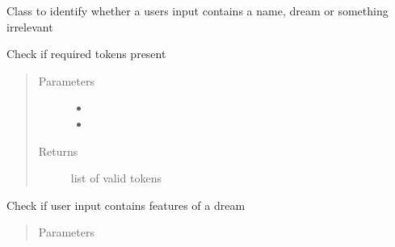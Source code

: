 \documentclass[letterpaper,10pt,english]{sphinxmanual}
\begin{document}
\begin{fulllineitems}
\label{\detokenize{index:Fralysis.MessageTypeAnalysis.MessageTypeAnalysis}}
Class to identify whether a users input contains a name, dream or something irrelevant

\begin{fulllineitems}
\label{\detokenize{index:Fralysis.MessageTypeAnalysis.MessageTypeAnalysis.check_token}}
Check if required tokens present
\begin{quote}\begin{description}
\item[{Parameters}] \leavevmode\begin{itemize}
\item {} 
 \textendash{} 

\item {} 
 \textendash{} 

\end{itemize}

\item[{Returns}] \leavevmode
list of valid tokens

\end{description}\end{quote}

\end{fulllineitems}


\begin{fulllineitems}
\label{\detokenize{index:Fralysis.MessageTypeAnalysis.MessageTypeAnalysis.is_dream}}
Check if user input contains features of a dream
\begin{quote}\begin{description}
\item[{Parameters}] \leavevmode
{} \textendash{} 


\end{description}
\end{quote}
\end{fulllineitems}
\end{fulllineitems}
\end{document}
